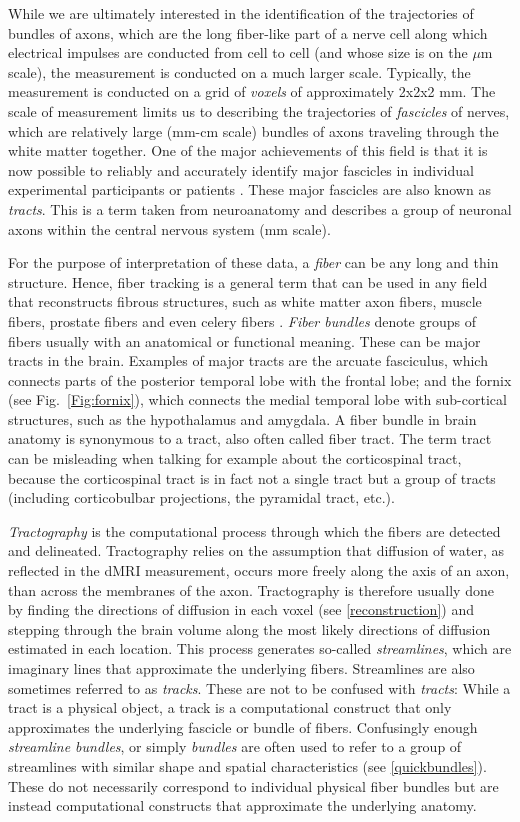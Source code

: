 \documentclass{bioinfo}
\begin{document}
While we are ultimately interested in the identification of the trajectories of
bundles of axons, which are the long fiber-like part of a nerve cell along which
electrical impulses are conducted from cell to cell (and whose size is on the
$\mu$m scale), the measurement is conducted on a much larger scale. Typically,
the measurement is conducted on a grid of \emph{voxels} of approximately 2x2x2
mm. The scale of measurement limits us to describing the trajectories of
\emph{fascicles} of nerves, which are relatively large (mm-cm scale) bundles of
axons traveling through the white matter together. One of the major
achievements of this field is that it is now possible to reliably and accurately
identify major fascicles in individual experimental participants or patients
\citep{mori-atlas}. These major fascicles are also known as \emph{tracts}. This
is a term taken from neuroanatomy and describes a group of neuronal axons within
the central nervous system (mm scale).

For the purpose of interpretation of these data, a \emph{fiber} can be any long and
thin structure. Hence, fiber tracking is a general term that can be used in any
field that reconstructs fibrous structures, such as white matter axon fibers,
muscle fibers, prostate fibers and even celery fibers \citep{Numano2006}. \emph{Fiber bundles} denote
groups of fibers usually with an anatomical or functional meaning. These can be
major tracts in the brain. Examples of major tracts are the arcuate fasciculus,
which connects parts of the posterior temporal lobe with the frontal lobe; and the
fornix (see Fig.~\ref{Fig:fornix}), which connects the medial temporal lobe with
sub-cortical structures, such as the hypothalamus and amygdala. A fiber
bundle in brain anatomy is synonymous to a tract, also often called
fiber tract. The term tract can be misleading when talking for example about the
corticospinal tract, because the corticospinal tract is in fact not a single
tract but a group of tracts (including corticobulbar projections, the pyramidal
tract, etc.).

\emph{Tractography} is the computational process through which the fibers are detected
and delineated. Tractography relies on the assumption that diffusion of water,
as reflected in the dMRI measurement, occurs more freely along the axis of an
axon, than across the membranes of the axon. Tractography is therefore usually
done by finding the directions of diffusion in each voxel (see
\ref{reconstruction}) and stepping through the brain volume along the most
likely directions of diffusion estimated in each location. This process
generates so-called \emph{streamlines}, which are imaginary lines that approximate the
underlying fibers. Streamlines are also sometimes referred to as \emph{tracks}. These
are not to be confused with \emph{tracts}: While a tract is a physical object, a track
is a computational construct that only approximates the underlying fascicle or
bundle of fibers. Confusingly enough \emph{streamline bundles}, or simply \emph{bundles}
are often used to refer to a group of streamlines with similar shape and
spatial characteristics (see \ref{quickbundles}). These do not necessarily
correspond to individual physical fiber bundles but are instead computational
constructs that approximate the underlying anatomy.
\end{document}
